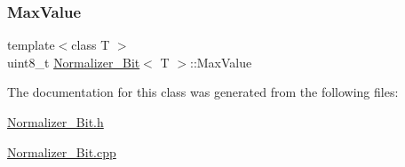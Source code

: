 \subsubsection{\texorpdfstring{Max\+Value}{MaxValue}}
{\footnotesize\ttfamily template$<$class T $>$ \\
uint8\+\_\+t \hyperlink{classNormalizer__8Bit}{Normalizer\+\_\+Bit}$<$ T $>$\+::Max\+Value}



The documentation for this class was generated from the following files\+:\begin{DoxyCompactItemize}
\item 
\hyperlink{Normalizer__8Bit_8h}{Normalizer\+\_\+Bit.\+h}\item 
\hyperlink{Normalizer__8Bit_8cpp}{Normalizer\+\_\+Bit.\+cpp}\end{DoxyCompactItemize}
